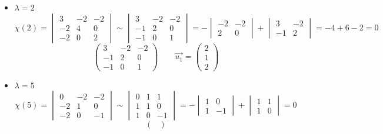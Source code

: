 \begin{itemize}
	\item $ \lambda = 2 $
    $$ \chi(2) =
    \begin{vmatrix}
    	3 & -2 & -2 \\
        -2 & 4 & 0 \\
        -2 & 0 & 2
    \end{vmatrix} \sim
    \begin{vmatrix}
    	3 & -2 & -2 \\
        -1 & 2 & 0 \\
        -1 & 0 & 1
    \end{vmatrix} = -
    \begin{vmatrix}
    	-2 & -2 \\
        2 & 0
    \end{vmatrix} +
    \begin{vmatrix}
    	3 & -2 \\
        -1 & 2
    \end{vmatrix} = -4 + 6 - 2 = 0 $$
    $$
    \begin{pmatrix}
    	3 & -2 & -2 \\
        -1 & 2 & 0 \\
        -1 & 0 & 1
    \end{pmatrix} \qquad \vec{u_1} =
    \begin{pmatrix}
    	2 \\
        1 \\
        2
    \end{pmatrix} $$
    \item $ \lambda = 5 $
    $$ \chi(5) =
    \begin{vmatrix}
    	0 & -2 & -2 \\
        -2 & 1 & 0 \\
        -2 & 0 & -1
    \end{vmatrix} \sim
    \begin{vmatrix}
    	0 & 1 & 1 \\
        1 & 1 & 0 \\
        1 & 0 & -1
    \end{vmatrix} = -
    \begin{vmatrix}
    	1 & 0 \\
        1 & -1
    \end{vmatrix} +
    \begin{vmatrix}
    	1 & 1 \\
        1 & 0
    \end{vmatrix} = 0 $$
    $$
    \begin{pmatrix}

\end{pmatrix}$$
\end{itemize}
